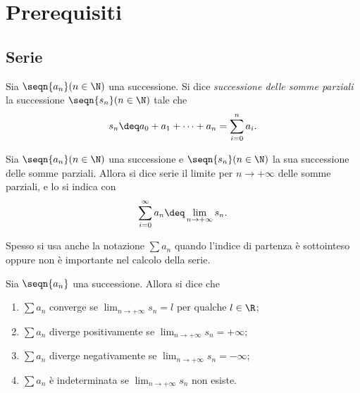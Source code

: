 \chapter{Prerequisiti}

\section{Serie}

\begin{definition}
     Sia $\seqn{a_n}(n \in \N)$ una successione. Si dice \emph{successione delle somme parziali} la successione $\seqn{s_n}(n \in \N)$ tale che \[
        s_n \deq a_0 + a_1 + \dots + a_n = \sum_{i=0}^n a_i.    
    \]
\end{definition}

\begin{definition}
    [Serie] Sia $\seqn{a_n}(n \in \N)$ una successione e $\seqn{s_n}(n \in \N)$ la sua successione delle somme parziali. Allora si dice serie il limite per $n \to +\infty$ delle somme parziali, e lo si indica con \[
        \sum_{i=0}^\infty a_n \deq \lim_{n\to +\infty} s_n.    
    \]
\end{definition}

Spesso si usa anche la notazione $\sum a_n$ quando l'indice di partenza è sottointeso oppure non è importante nel calcolo della serie.

\begin{definition}
     Sia $\seqn{a_n}$ una successione. Allora si dice che \begin{enumerate}[label={(\arabic*)}]
        \item $\sum a_n$ converge se $\displaystyle\lim_{n \to +\infty} s_n = l$ per qualche $l \in \R$;
        \item $\sum a_n$ diverge positivamente se $\displaystyle\lim_{n \to +\infty} s_n = +\infty$;
        \item $\sum a_n$ diverge negativamente se $\displaystyle\lim_{n \to +\infty} s_n = -\infty$;
        \item $\sum a_n$ è indeterminata se $\displaystyle\lim_{n \to +\infty} s_n$ non esiste.
    \end{enumerate}
\end{definition}

